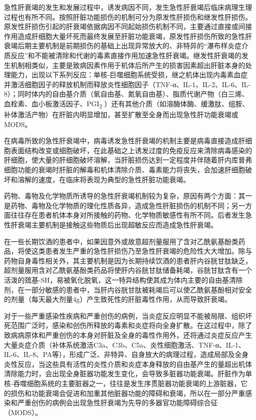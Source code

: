 急性肝衰竭的发生和发展过程中，诱发病因不同，发生急性肝衰竭后临床病理生理过程也有所不同。按照肝脏功能损伤的机制可分为原发性肝损伤和继发性肝损伤。原发性肝损伤引起的肝衰竭依据病因不同起始损伤机制不同，主要通过直接或间接作用造成肝细胞大量坏死而最终发展至肝脏功能衰竭，原发性肝损伤所致的急性肝衰竭后期主要机制是前期损伤的基础上出现异常放大的、非特异的“瀑布样炎症介质反应”和不能被清除和代谢的毒素直接作用加速急性肝衰竭。继发性肝衰竭的发生机制相类似，主要是致病因素作用于机体后所产生的损害因素超出肝脏本身的处理能力，出现以下系列反应：单核-巨噬细胞系统受损，继之机体出现内毒素血症并激活细胞因子的释放机制而释放炎性细胞因子（TNF-α、IL-1、IL-2、IL-6、IL-8）；同时体内的自由基介质（氧自由基、氮氧自由基）、脂质代谢产物（白三烯、血栓素、血小板激活因子、PGI\textsubscript{2}
）还有其他介质（如溶酶体酶、缓激肽、组胺、补体激活产物）在肝脏内明显增加，甚至扩散至全身而出现急性肝功能衰竭或MODS。

在病毒所致的急性肝衰竭中，病毒诱发急性肝衰竭的机制主要是病毒直接造成肝细胞表面结构改变或细胞破坏，在此基础之上诱发过度的免疫反应来清除病毒感染的肝细胞，使大量的肝细胞破坏溶解，当肝脏损伤达到一定程度并伴随着肝内库普弗细胞功能的衰竭时肝脏的解毒和机体清除介质、毒素能力将丧失，会加速肝细胞破坏和溶解的速度，在临床将表现为典型的急性肝脏功能衰竭。

药物、毒物及化学物质所诱导的急性肝衰竭机制较为复杂，原因有两个方面：其一是药物、毒物及化学物质的理化性质各异，造成急性肝脏损伤的机制不同；另一方面往往存在患者机体本身对所接触的药物、化学物质敏感性有所不同。后者发生急性肝衰竭主要机制是接触这些物质后出现超敏反应而造成急性肝衰竭。

在一些长期饮酒的患者中，如果因意外或故意超剂量服用了含对乙酰氨基酚类药品，将使这类患者发生严重的急性肝损伤乃至急性肝衰竭的危险性大大增加。除与药物自身毒性相关外，其主要机制是因为长期持续饮酒的患者肝内谷胱甘肽缺乏，超剂量服用含对乙酰氨基酚类药品将使肝内谷胱甘肽储备耗竭，谷胱甘肽含有一个活泼的巯基-SH，易被氧化脱氧，这一特异结构使其成为体内主要的自由基清除剂，在一部分敏感的患者中，当肝内谷胱甘肽被耗竭后可以使乙酰氨基酚相对安全的剂量（每天最大剂量4g）产生致死性的肝脏毒性作用，从而导致肝衰竭。

对于一些严重感染性疾病和严重创伤的病例，当炎症反应明显不能被局限、组织坏死范围广泛时，感染和创伤所释放的毒素和炎症将向全身扩散。在这过程中，除了致病病原体和严重创伤的本身对肝脏及全身的毒性作用外，还将通过炎症反应产生大量炎症介质（补体系统激活C3a、C3b、C5a、炎性细胞激活、TNF-α、IL-1、IL-6、IL-8、PA等），形成广泛、非特异、自身放大的病理过程，造成局部及全身炎性反应，当这些具有活性的炎性介质和炎症本身释放的自由基产生的量超出机体清除能力时，会出现全身脏器功能发生变化，会导致多脏器功能衰竭。肝脏作为单核-吞噬细胞系统的主要脏器之一，往往是发生序贯脏器功能衰竭的上游脏器，它的损伤和功能衰竭会促进和加重其他脏器功能的障碍和衰竭，所以在一部分严重感染和严重创伤的病例会出现急性肝衰竭为先导的多器官功能障碍综合征（MODS）。

